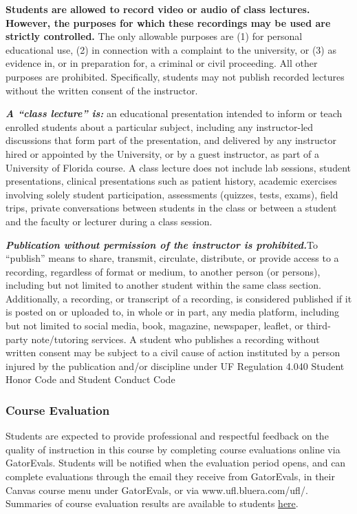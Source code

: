 \documentclass[
  12pt,
]{article}
\begin{document}
\textbf{Students are allowed to record video or audio of class lectures.
However, the purposes for which these recordings may be used are
strictly controlled.} The only allowable purposes are (1) for personal
educational use, (2) in connection with a complaint to the university,
or (3) as evidence in, or in preparation for, a criminal or civil
proceeding. All other purposes are prohibited. Specifically, students
may not publish recorded lectures without the written consent of the
instructor.

\textbf{\emph{A ``class lecture'' is:}} an educational presentation
intended to inform or teach enrolled students about a particular
subject, including any instructor-led discussions that form part of the
presentation, and delivered by any instructor hired or appointed by the
University, or by a guest instructor, as part of a University of Florida
course. A class lecture does not include lab sessions, student
presentations, clinical presentations such as patient history, academic
exercises involving solely student participation, assessments (quizzes,
tests, exams), field trips, private conversations between students in
the class or between a student and the faculty or lecturer during a
class session.

\textbf{\emph{Publication without permission of the instructor is
prohibited.}}To ``publish'' means to share, transmit, circulate,
distribute, or provide access to a recording, regardless of format or
medium, to another person (or persons), including but not limited to
another student within the same class section. Additionally, a
recording, or transcript of a recording, is considered published if it
is posted on or uploaded to, in whole or in part, any media platform,
including but not limited to social media, book, magazine, newspaper,
leaflet, or third-party note/tutoring services. A student who publishes
a recording without written consent may be subject to a civil cause of
action instituted by a person injured by the publication and/or
discipline under UF Regulation 4.040 Student Honor Code and Student
Conduct Code

\hypertarget{course-evaluation}{%
\subsubsection{\texorpdfstring{\textbf{Course
Evaluation}}{Course Evaluation}}\label{course-evaluation}}

Students are expected to provide professional and respectful feedback on
the quality of instruction in this course by completing course
evaluations online via GatorEvals. Students will be notified when the
evaluation period opens, and can complete evaluations through the email
they receive from GatorEvals, in their Canvas course menu under
GatorEvals, or via www.ufl.bluera.com/ufl/. Summaries of course
evaluation results are available to students
\href{https://gatorevals.aa.ufl.edu/public-results/}{here}.
\end{document}
